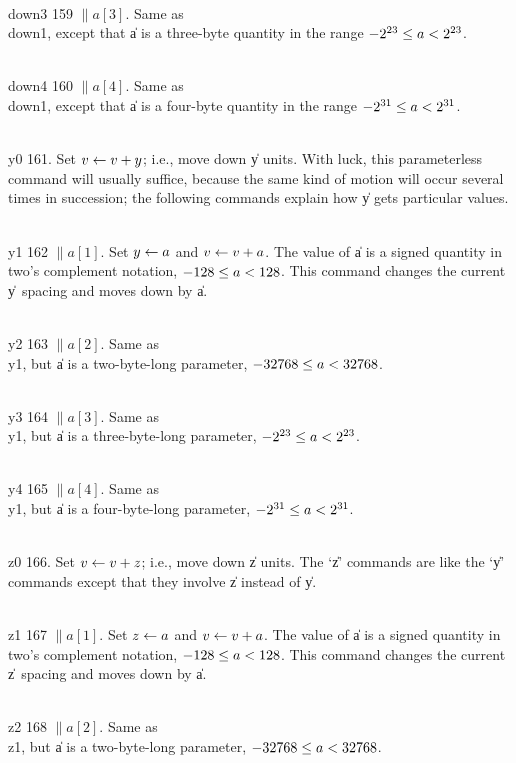 \yskip\hang\\{down3} 159 $\|a[3]$. Same as \\{down1}, except that \|a is a
three-byte quantity in the range $\hbox{$-2^{23}$}\le\hbox{$a$}<\hbox{$2^{23}$}$.

\yskip\hang\\{down4} 160 $\|a[4]$. Same as \\{down1}, except that \|a is a
four-byte quantity in the range $\hbox{$-2^{31}$}\le\hbox{$a$}<\hbox{$2^{31}$}$.

\yskip\hang\\{y0} 161. Set $\hbox{$v$}\gets\hbox{$v$}+\hbox{$y$}$; i.e., move down \|y units. With
luck,
this parameterless command will usually suffice, because the same kind of
motion
will occur several times in succession; the following commands explain how
\|y gets particular values.

\yskip\hang\\{y1} 162 $\|a[1]$. Set $\hbox{$y$}\gets\hbox{$a$}$ and $\hbox{$v$}\gets\hbox{$v$}+\hbox{$a$}$. The value of
\|a is a
signed quantity in two's complement notation, $-128\le\hbox{$a$}<128$. This command
changes the current \|y~spacing and moves down by \|a.

\yskip\hang\\{y2} 163 $\|a[2]$. Same as \\{y1}, but \|a is a two-byte-long
parameter, $-32768\le\hbox{$a$}<32768$.

\yskip\hang\\{y3} 164 $\|a[3]$. Same as \\{y1}, but \|a is a three-byte-long
parameter, $\hbox{$-2^{23}$}\le\hbox{$a$}<\hbox{$2^{23}$}$.

\yskip\hang\\{y4} 165 $\|a[4]$. Same as \\{y1}, but \|a is a four-byte-long
parameter, $\hbox{$-2^{31}$}\le\hbox{$a$}<\hbox{$2^{31}$}$.

\yskip\hang\\{z0} 166. Set $\hbox{$v$}\gets\hbox{$v$}+\hbox{$z$}$; i.e., move down \|z units. The `\|z'
commands
are like the `\|y' commands except that they involve \|z instead of \|y.

\yskip\hang\\{z1} 167 $\|a[1]$. Set $\hbox{$z$}\gets\hbox{$a$}$ and $\hbox{$v$}\gets\hbox{$v$}+\hbox{$a$}$. The value of
\|a is a
signed quantity in two's complement notation, $-128\le\hbox{$a$}<128$. This command
changes the current \|z~spacing and moves down by \|a.

\yskip\hang\\{z2} 168 $\|a[2]$. Same as \\{z1}, but \|a is a two-byte-long
parameter, $-32768\le\hbox{$a$}<32768$.

